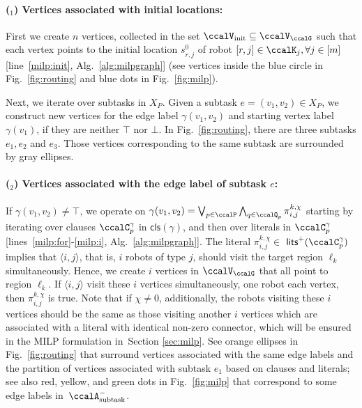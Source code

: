 \documentclass[Afour,sageh,times]{sagej}
\newcounter{mycounter}
\newcommand{\clause}[1]{\mathsf{cls}(#1)}
\newcommand{\auto}[1]{\ccalA_{\textup{#1}}}
\newcommand{\ag}[2]{\langle#1,#2\rangle}
\renewcommand{\ap}[3]{\mathcal{\pi}_{{#1},{#2}}^{#3}}
\begin{document}
\paragraph{($_1$) Vertices associated with initial locations:}\label{vertex:initial} First we create $n$ vertices, collected in the set $\ccalV_{\text{init}}\subseteq \ccalV_{\ccalG}$ such that each vertex points to the initial location $s^0_{r,j}$ of robot $[r,j]\in\ccalK_j, \forall j\in [m]$ [line~\ref{milp:init}, Alg.~\ref{alg:milpgraph}] (see vertices inside the blue circle in Fig.~\ref{fig:routing} and blue dots in Fig.~\ref{fig:milp}).

Next, we iterate over subtasks in $X_{P}$. Given a subtask $e = (v_1, v_2) \in X_{P}$, we construct new vertices for the  edge label $\gamma(v_1, v_2)$ and starting vertex label $\gamma(v_1)$, if they are neither $\top$ nor $\bot$. In Fig.~\ref{fig:routing}, there are three subtasks $e_1, e_2$ and $e_3$. Those vertices corresponding to the same subtask are surrounded by gray ellipses.

\paragraph{($_2$) Vertices associated with the edge label of subtask $e$:}\label{vertex:edge} If $\gamma(v_1, v_2) \not= \top$, we operate on $\gamma(v_1, v_2) =  \bigvee_{p\in \ccalP} \bigwedge_{q \in \ccalQ_{p}} \ap{i}{j}{k,\chi}$ starting by iterating over clauses $\ccalC_p^{\gamma}$ in $\clause{\gamma}$, and then over literals in $\ccalC_p^\gamma$ [lines~\ref{milp:for}-\ref{milp:i}, Alg.~\ref{alg:milpgraph}].
The literal $\ap{i}{j}{k,\chi}\in $ $\mathsf{lits}^+(\ccalC_p^{\gamma})$ implies that $\ag{i}{j}$, that is, $i$ robots of type $j$,  should visit the target region $\ell_k$ simultaneously. Hence, we create $i$ vertices in $\ccalV_\ccalG$  that all point to region $\ell_k$. If $\ag{i}{j}$ visit these $i$ vertices simultaneously, one robot each vertex, then $\ap{i}{j}{k,\chi}$ is true. Note that if $\chi\not=0$, additionally, the robots visiting these $i$ vertices should be the same as those visiting another $i$ vertices which are associated with a literal with identical non-zero connector, which will be ensured in the MILP formulation in~Section \ref{sec:milp}. See orange ellipses in Fig.~\ref{fig:routing} that surround vertices associated with the same edge labels and the partition of vertices associated with subtask $e_1$ based on clauses and literals; see also red, yellow, and green dots in Fig.~\ref{fig:milp} that correspond to some edge labels in~$\auto{subtask}^-$.
\end{document}

